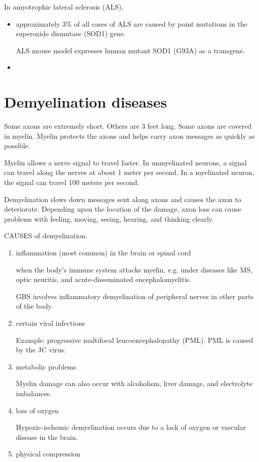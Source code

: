 In amyotrophic lateral sclerosis (ALS), 
\begin{itemize}
  \item approximately 3\% of all cases of ALS are
caused by point mutations in the superoxide dismutase (SOD1) gene.
  
  ALS mouse model expresses human mutant SOD1 (G93A) as a transgene.
  
  \item 
\end{itemize}


\section{Demyelination diseases}
\label{sec:demyelination-diseases}

Some axons are extremely short. Others are 3 feet long. Some axons are covered
in myelin. Myelin protects the axons and helps carry axon messages as quickly as
possible.

Myelin allows a nerve signal to travel faster. In unmyelinated neurons, a signal
can travel along the nerves at about 1 meter per second. In a myelinated neuron,
the signal can travel 100 meters per second.

\begin{mdframed}

Demyelination slows down messages sent along axons and causes the axon to
deteriorate. Depending upon the location of the damage, axon loss can cause
problems with feeling, moving, seeing, hearing, and thinking clearly.
 
\end{mdframed}

CAUSES of demyelination:
\begin{enumerate}
  \item inflammation (most common) in the brain or spinal cord
  
  when the body’s immune system attacks myelin, e.g. under diseases like
  MS, optic neuritis, and acute-disseminated encephalomyelitis.
  
   GBS involves inflammatory demyelination of peripheral nerves in other parts of the body.
  
  \item certain viral infections
  
  Example:  progressive multifocal leucoencephalopathy (PML). PML is caused by the JC virus.

  \item metabolic problems
  
  Myelin damage can also occur with alcoholism, liver damage, and electrolyte imbalances. 
  
  \item loss of oxygen
  
  Hypoxic-ischemic demyelination occurs due to a lack of oxygen or vascular disease in the brain.
  
  
  \item physical compression

\end{enumerate}


